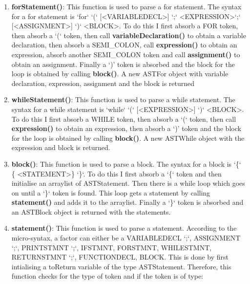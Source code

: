 \documentclass{article}
\begin{document}
\begin{enumerate}
						\item \textbf{forStatement()}: This function is used to parse a for statement. The syntax for a for statement is `for` `(` [\textless VARIABLEDECL\textgreater] `;` \textless EXPRESSION\textgreater `;` [\textless ASSIGNMENT\textgreater] `)` \textless BLOCK\textgreater. To do this I first absorb a FOR token, then absorb a `(` token, then call \textbf{variableDeclaration()} to obtain a variable declaration, then absorb a SEMI\_COLON, call \textbf{expression()} to obtain an expression, absorb another SEMI\_COLON token and call \textbf{assignment()} to obtain an assignment. Finally a `)' token is absorbed and the block for the loop is obtained by calling \textbf{block()}. A new ASTFor object with variable declaration, expression, assignment and the block is returned
			
			
								\item \textbf{whileStatement()}: This function is used to parse a while statement. The syntax for a while statement is `while` `(` [\textless EXPRESSION\textgreater] `)` \textless BLOCK\textgreater. To do this I first absorb a WHILE token, then absorb a `(` token, then call \textbf{expression()} to obtain an expression, then absorb a `)' token and the block for the loop is obtained by calling \textbf{block()}. A new ASTWhile object with the expression and block is returned.
								
							\item \textbf{block()}: This function is used to parse a block. The syntax for a block is `\{` \{ \textless STATEMENT\textgreater \} `\}`. To do this I first absorb a `\{` token and then initialise an arraylist of ASTStatement. Then there is a while loop which goes on until a `\}` token is found. This loop gets a statement by calling \textbf{statement()} and adds it to the arraylist. Finally a `\}` token is absorbed and an ASTBlock object is returned with the statements.
				
					\item \textbf{statement()}: This function is used to parse a statement. According to the micro-syntax, a factor can either be a VARIABLEDECL `;`, ASSIGNMENT `;`,  PRINTSTMNT `;`, IFSTMNT, FORSTMNT,  WHILESTMNT, RETURNSTMNT `;`, FUNCTIONDECL, BLOCK.
					This is done by first intialising a toReturn variable of the type ASTStatement. Therefore, this function checks for the type of token and if the token is of type:
				

\end{enumerate}
\end{document}
